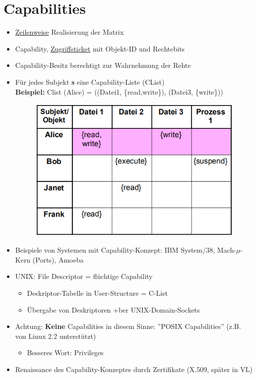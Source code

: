 \documentclass[openany]{book}
\begin{document}
\section{Capabilities}

\begin{itemize}
\item \underline{Zeilenweise} Realisierung der Matrix
\item Capability, \underline{Zugriffsticket} mit Objekt-ID und Rechtebits
\item Capability-Besitz berechtigt zur Wahrnehmung der Rehte
\item Für jedes Subjekt \textbf{s} eine Capability-Liste (CList) \\ \textbf{Beispiel:} Clist (Alice) = ((Datei1, \{read,write\}), (Datei3, \{write\}))
\begin{figure}[h!]
\centering
\includegraphics[width=0.7\linewidth]{Pics/CapabilityACL.PNG}
\end{figure}
\item Beispiele von Systemen mit Capability-Konzept: IBM System/38, Mach-$\mu$-Kern (Ports), Amoeba
\item UNIX: File Descriptor = flüchtige Capability
\begin{itemize}
\item Deskriptor-Tabelle in User-Structure = C-List
\item Übergabe von Deskriptoren +ber UNIX-Domain-Sockets
\end{itemize}
\item Achtung: \textbf{Keine} Capabilities in diesem Sinne: ''POSIX Capabilities'' (z.B. von Linux 2.2 unterstützt)
\begin{itemize}
\item Besseres Wort: Privileges
\end{itemize}
\item Renaissance des Capability-Konzeptes durch Zertifikate (X.509, später in VL)
\end{itemize}
\end{document}
